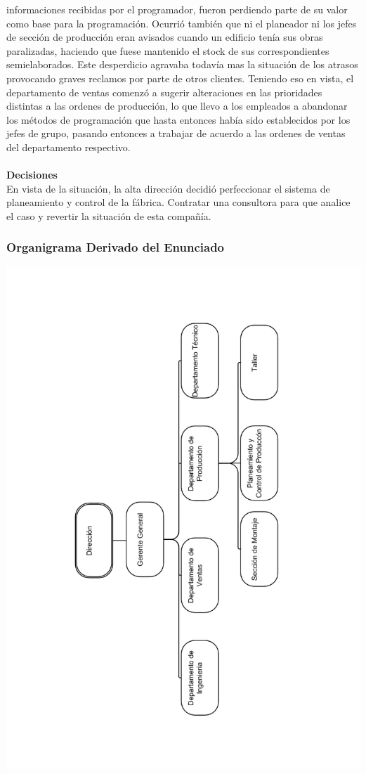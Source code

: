 \documentclass[a4paper,10pt,titlepage]{article}
\begin{document}
informaciones recibidas por el programador, fueron perdiendo parte de su valor como
base para la programaci\'on. Ocurri\'o tambi\'en que ni el planeador ni los jefes de secci\'on
de producci\'on eran avisados cuando un edificio ten\'ia sus obras paralizadas, haciendo
que fuese mantenido el stock de sus correspondientes semielaborados. Este
desperdicio agravaba todav\'ia mas la situaci\'on de los atrasos provocando graves
reclamos por parte de otros clientes. Teniendo eso en vista, el departamento de ventas
comenz\'o a sugerir alteraciones en las prioridades distintas a las ordenes de
producci\'on, lo que llevo a los empleados a abandonar los m\'etodos de programaci\'on
que hasta entonces hab\'ia sido establecidos por los jefes de grupo, pasando entonces a
trabajar de acuerdo a las ordenes de ventas del departamento respectivo.\\ \\
\textbf{Decisiones}\\
En vista de la situaci\'on, la alta direcci\'on decidi\'o perfeccionar el sistema de
planeamiento y control de la f\'abrica.
Contratar una consultora para que analice el caso y revertir la situaci\'on de esta compa\~n\'ia.

\newpage
\subsubsection{Organigrama Derivado del Enunciado}
\begin{center}
\includegraphics[width=150mm]{./herculesBN.png}
 \end{center}
\newpage
\end{document}
